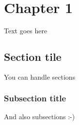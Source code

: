 \chapter{Chapter 1}\label{chap:chapter1}

Text goes here

\section{Section tile}
You can handle sections \cite{music}
\subsection{Subsection title}
And also subsections :-)